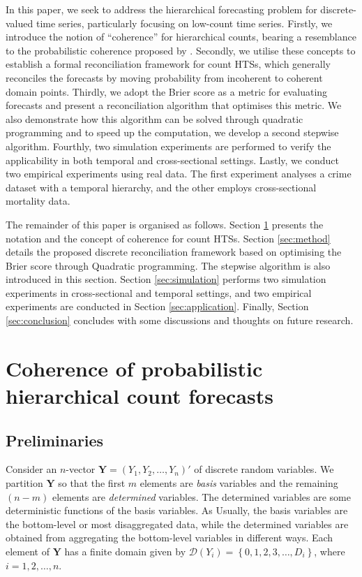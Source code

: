 \documentclass[a4paper,review,12pt,authoryear]{elsarticle}
\newcommand{\bY}{\mathbf{Y}}
\begin{document}
In this paper, we seek to address the hierarchical forecasting problem for discrete-valued time series, particularly focusing on low-count time series.
Firstly, we introduce the notion of ``coherence'' for hierarchical counts, 
bearing a resemblance to the probabilistic coherence proposed by \cite{panagiotelisProbabilisticForecastReconciliation2022}.
Secondly, we utilise these concepts to establish a formal reconciliation framework for count HTSs, which generally reconciles the forecasts by moving probability from incoherent to coherent domain points.
Thirdly, we adopt the Brier score as a metric for evaluating forecasts and present a reconciliation algorithm that optimises this metric. 
We also demonstrate how this algorithm can be solved through quadratic programming and to speed up the computation, we develop a second stepwise algorithm. 
Fourthly, two simulation experiments are performed to verify the applicability  in both temporal and cross-sectional settings. 
Lastly, we conduct two empirical experiments using real data. The first experiment analyses a crime dataset with a temporal hierarchy, and the other employs cross-sectional mortality data.

The remainder of this paper is organised as follows. 
Section \ref{sec:coherence} presents the notation and the concept of coherence for count HTSs.
Section \ref{sec:method} details the proposed discrete reconciliation framework based on optimising the Brier score through Quadratic programming. The stepwise algorithm is also introduced in this section. 
Section \ref{sec:simulation} performs two simulation experiments in cross-sectional and temporal settings, and two empirical experiments are conducted in Section \ref{sec:application}. 
Finally, Section \ref{sec:conclusion} concludes with some discussions and thoughts on future research.



\section{Coherence of probabilistic hierarchical count forecasts}

\label{sec:coherence}

	
\subsection{Preliminaries}
Consider an $n$-vector $\bY=\left(Y_1,Y_2,\ldots,Y_n\right)'$ of discrete random variables.
We partition $\bY$ so that the first $m$ elements are \textit{basis} variables and the remaining $(n-m)$ elements are \textit{determined} variables.
The determined variables are some deterministic functions of the basis variables. As Usually, the basis variables are the bottom-level or most disaggregated data, while the determined variables are obtained from aggregating the bottom-level variables in different ways. 
Each element of $\bY$ has a finite domain given by $\mathcal{D}(Y_i)=\left\{0, 1,2,3,\dots,D_i\right\}$, where $i = 1, 2, \dots, n$.
\end{document}
